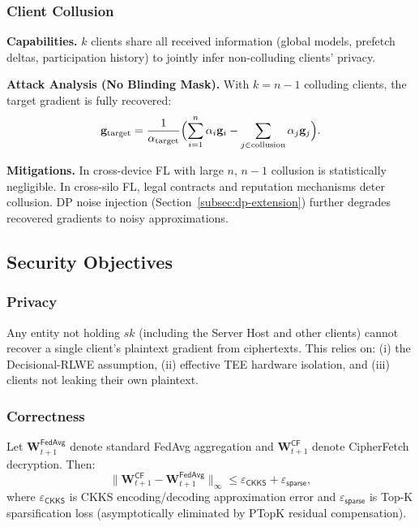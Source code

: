 \subsubsection{Client Collusion}

\textbf{Capabilities.} $k$ clients share all received information (global models, prefetch deltas, participation history) to jointly infer non-colluding clients' privacy.

\textbf{Attack Analysis (No Blinding Mask).} With $k = n-1$ colluding clients, the target gradient is fully recovered:
\begin{equation}
\mathbf{g}_{\text{target}} = \frac{1}{\alpha_{\text{target}}} \Bigl( \sum_{i=1}^{n} \alpha_i \mathbf{g}_i - \sum_{j \in \text{collusion}} \alpha_j \mathbf{g}_j \Bigr).
\end{equation}

\textbf{Mitigations.} In cross-device FL with large $n$, $n-1$ collusion is statistically negligible. In cross-silo FL, legal contracts and reputation mechanisms deter collusion. DP noise injection (Section~\ref{subsec:dp-extension}) further degrades recovered gradients to noisy approximations.

\subsection{Security Objectives}

\subsubsection{Privacy}

Any entity not holding $sk$ (including the Server Host and other clients) cannot recover a single client's plaintext gradient from ciphertexts. This relies on: (i) the Decisional-RLWE assumption, (ii) effective TEE hardware isolation, and (iii) clients not leaking their own plaintext.

\subsubsection{Correctness}

Let $\mathbf{W}_{t+1}^{\textsf{FedAvg}}$ denote standard FedAvg aggregation and $\mathbf{W}_{t+1}^{\textsf{CF}}$ denote CipherFetch decryption. Then:
\begin{equation}
\|\mathbf{W}_{t+1}^{\textsf{CF}} - \mathbf{W}_{t+1}^{\textsf{FedAvg}}\|_\infty \leq \varepsilon_{\textsf{CKKS}} + \varepsilon_{\textsf{sparse}},
\end{equation}
where $\varepsilon_{\textsf{CKKS}}$ is CKKS encoding/decoding approximation error and $\varepsilon_{\textsf{sparse}}$ is Top-K sparsification loss (asymptotically eliminated by PTopK residual compensation).

